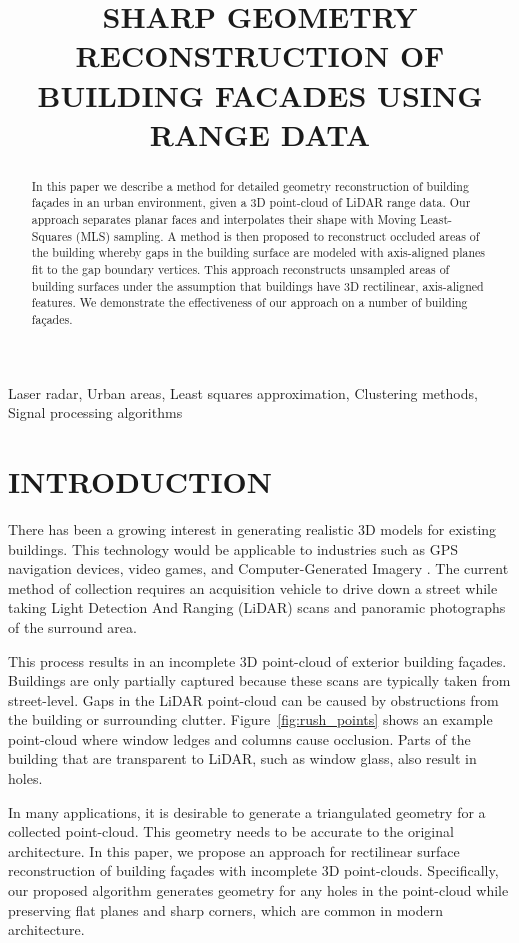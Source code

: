 \documentclass{article}
\title{SHARP GEOMETRY RECONSTRUCTION OF BUILDING FACADES USING RANGE DATA}
\begin{document}
%
\maketitle
%
\begin{abstract}
In this paper we describe a method for detailed geometry reconstruction of building fa\c{c}ades in an urban environment, given a 3D point-cloud of LiDAR range data.  Our approach separates planar faces and interpolates their shape with Moving Least-Squares (MLS) sampling.  A method is then proposed to reconstruct occluded areas of the building whereby gaps in the building surface are modeled with axis-aligned planes fit to the gap boundary vertices.  This approach reconstructs unsampled areas of building surfaces under the assumption that buildings have 3D rectilinear, axis-aligned features.  We demonstrate the effectiveness of our approach on a number of building fa\c{c}ades.
\end{abstract}
%
\begin{keywords}
Laser radar, Urban areas, Least squares approximation, Clustering methods, Signal processing algorithms
\end{keywords}
%
\section{INTRODUCTION}
\label{sec:intro}

There has been a growing interest in generating realistic 3D models for existing buildings.  This technology would be applicable to industries such as GPS navigation devices, video games, and Computer-Generated Imagery \cite{Zakhor07}.  The current method of collection requires an acquisition vehicle to drive down a street while taking Light Detection And Ranging (LiDAR) scans and panoramic photographs of the surround area.

This process results in an incomplete 3D point-cloud of exterior building fa\c{c}ades.  Buildings are only partially captured because these scans are typically taken from street-level.  Gaps in the LiDAR point-cloud can be caused by obstructions from the building or surrounding clutter.  Figure~\ref{fig:rush_points} shows an example point-cloud where window ledges and columns cause occlusion.  Parts of the building that are transparent to LiDAR, such as window glass, also result in holes.

In many applications, it is desirable to generate a triangulated geometry for a collected point-cloud.  This geometry needs to be accurate to the original architecture.  In this paper, we propose an approach for rectilinear surface reconstruction of building fa\c{c}ades with incomplete 3D point-clouds.  Specifically, our proposed algorithm generates geometry for any holes in the point-cloud while preserving flat planes and sharp corners, which are common in modern architecture.
\end{document}
